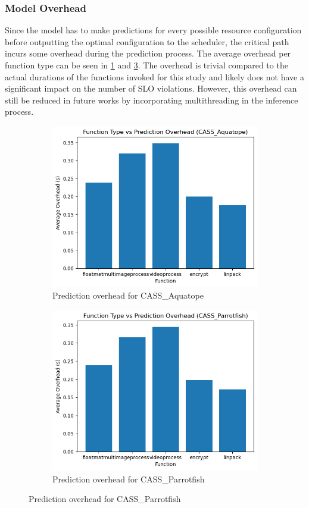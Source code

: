 \documentclass[times, 10pt,twocolumn]{article}
\begin{document}
\subsubsection{Model Overhead}

Since the model has to make predictions for every possible resource configuration before outputting the optimal configuration to the scheduler, the critical path incurs some overhead during the prediction process. The average overhead per function type can be seen in \ref{fig:cass_aquatope_overhead} and \ref{fig:cass_parrotfish_overhead}. The overhead is trivial compared to the actual durations of the functions invoked for this study and likely does not have a significant impact on the number of SLO violations. However, this overhead can still be reduced in future works by incorporating multithreading in the inference process. 

\begin{figure}[H] %
   \centering
   \begin{subfigure}[b]{0.5\textwidth} %
         \centering
         \includegraphics[width=0.6\linewidth]{imgs/final_experiment_plots/model_analysis/prediction_overhead/cass_aquatope.png}
         \caption{Prediction overhead for CASS\_Aquatope}
         \label{fig:cass_aquatope_overhead}
   \end{subfigure}
   \begin{subfigure}[b]{0.5\textwidth} %
         \centering
         \includegraphics[width=0.6\linewidth]{imgs/final_experiment_plots/model_analysis/prediction_overhead/cass_parrotfish.png}
         \caption{Prediction overhead for CASS\_Parrotfish}
         \label{fig:cass_parrotfish_overhead}
   \end{subfigure}
   \end{figure}
\end{document}
